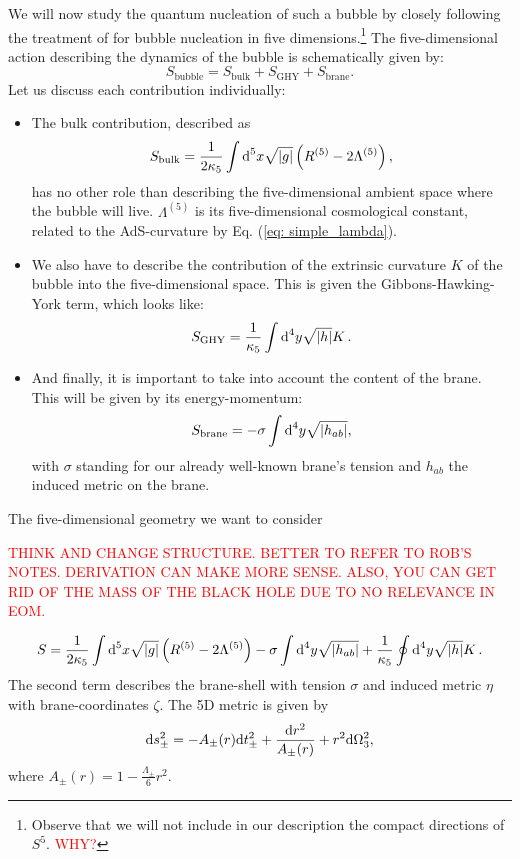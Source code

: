 We will now study the quantum nucleation of such a bubble by closely following the treatment of \cite{Ansoldi:1997hz} for bubble nucleation in five dimensions.\footnote{Observe that we will not include in our description the compact directions of $S^{5}$. \textcolor{red}{WHY?}} The five-dimensional action describing the dynamics of the bubble is schematically given by:
\begin{equation}\label{eq: qb_total_action}
    S_{\text{bubble}} = S_{\text{bulk}} + S_{\text{GHY}} + S_{\text{brane}}.
\end{equation}
Let us discuss each contribution individually:
\begin{itemize}
    \item The bulk contribution, described as
    \begin{equation}\label{eq: qb_bulk_action}
        S_{\text{bulk}} = \frac{1}{2\kappa_5} \int \text{d}^5 x \sqrt{|g|} \left( R^{(5)} - 2 \Lambda^{(5)} \right),
    \end{equation}
    has no other role than describing the five-dimensional ambient space where the bubble will live. $\Lambda^{(5)}$ is its five-dimensional cosmological constant, related to the AdS-curvature by Eq. (\ref{eq: simple_lambda}).
    \item We also have to describe the contribution of the extrinsic curvature $K$ of the bubble into the five-dimensional space. This is given the Gibbons-Hawking-York term, which looks like:
    \begin{equation}\label{eq: qb_extrinsic_action}
        S_{\text{GHY}} = \frac{1}{\kappa_5} \int \text{d}^4 y \sqrt{|h|} K\,.
    \end{equation}
    \item And finally, it is important to take into account the content of the brane. This will be given by its energy-momentum:
    \begin{equation}\label{eq: qb_EM_action}
        S_{\text{brane}}=-\sigma \int \text{d}^4 y \sqrt{|h_{ab}|},
    \end{equation}
    with $\sigma$ standing for our already well-known brane's tension and $h_{ab}$ the induced metric on the brane.
\end{itemize}
The five-dimensional geometry we want to consider 


\textcolor{red}{THINK AND CHANGE STRUCTURE. BETTER TO REFER TO ROB'S NOTES. DERIVATION CAN MAKE MORE SENSE. ALSO, YOU CAN GET RID OF THE MASS OF THE BLACK HOLE DUE TO NO RELEVANCE IN EOM.}


\begin{equation}
S=\frac{1}{2\kappa_5} \int \text{d}^5 x \sqrt{|g|} \left( R^{(5)} - 2 \Lambda^{(5)} \right) -\sigma \int \text{d}^4 y \sqrt{|h_{ab}|}  +\frac{1}{\kappa_5} \oint \text{d}^4 y \sqrt{|h|} K\,. \label{5Daction}
\end{equation}
The second term describes the brane-shell with tension $\sigma$ and induced metric $\eta$ with brane-coordinates $\zeta$.  The 5D metric is given by
\begin{equation}
\text{d} s_{\pm}^2 = -A_{\pm}(r)\text{d} t_{\pm}^2+\frac{\text{d} r^2}{A_{\pm}(r)} + r^2\text{d}\Omega_{3}^2, \label{eq: metric int/ext}
\end{equation}
where $A_{\pm}(r) = 1 -\frac{\Lambda_{\pm}}{6}r^2$.

